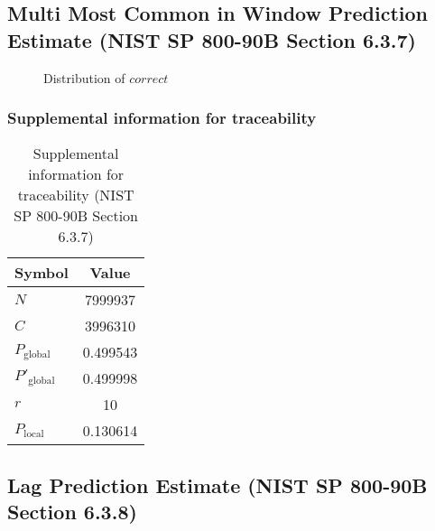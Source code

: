 \documentclass[a3paper,xelatex,english]{bxjsarticle}
\begin{document}
\subsection{Multi Most Common in Window Prediction Estimate (NIST SP 800-90B Section 6.3.7)}\label{sec:Binary637}

\begin{figure}[htbp]
\centering

\caption{Distribution of $correct$}
\end{figure}
\subsubsection{Supplemental information for traceability}
\renewcommand{\arraystretch}{1.8}
\begin{table}[h]
\caption{Supplemental information for traceability (NIST SP 800-90B Section 6.3.7)}
\begin{center}
\begin{tabular}{|l|c|}
\hline 
\rowcolor{anotherlightblue} %
Symbol				& Value \\ \hline 
$N$				& 7999937\\ \hline 
$C$				& 3996310\\ \hline 
$P_{\textrm{global}}$				& 0.499543\\ \hline 
$P'_{\textrm{global}}$			& 0.499998\\ \hline 
$r$				& 10\\ \hline 
$P_{\textrm{local}}$ 			& 0.130614\\ \hline
\end{tabular}
\end{center}
\end{table}
\renewcommand{\arraystretch}{1.4}
\clearpage
\subsection{Lag Prediction Estimate (NIST SP 800-90B Section 6.3.8)}\label{sec:Binary638}
\end{document}
